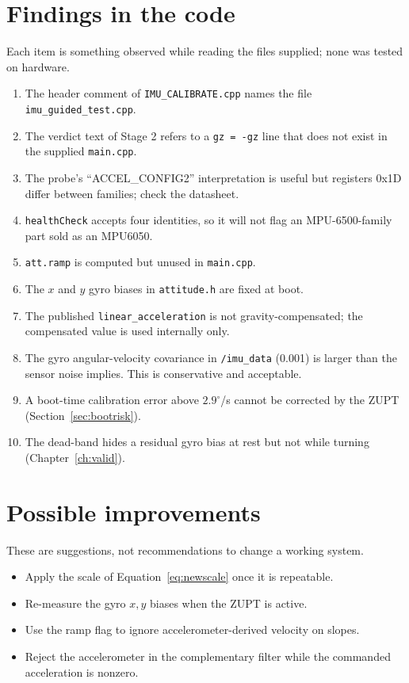 \documentclass[11pt,a4paper]{report}
\newcommand{\code}[1]{\texttt{#1}}
\begin{document}
\section{Findings in the code}
Each item is something observed while reading the files supplied; none was tested on hardware.
\begin{enumerate}[noitemsep]
  \item The header comment of \code{IMU\_CALIBRATE.cpp} names the file \code{imu\_guided\_test.cpp}.
  \item The verdict text of Stage 2 refers to a \code{gz = -gz} line that does not exist in the supplied \code{main.cpp}.
  \item The probe's ``ACCEL\_CONFIG2'' interpretation is useful but registers 0x1D differ between families; check the datasheet.
  \item \code{healthCheck} accepts four identities, so it will not flag an MPU-6500-family part sold as an MPU6050.
  \item \code{att.ramp} is computed but unused in \code{main.cpp}.
  \item The $x$ and $y$ gyro biases in \code{attitude.h} are fixed at boot.
  \item The published \code{linear\_acceleration} is not gravity-compensated; the compensated value is used internally only.
  \item The gyro angular-velocity covariance in \code{/imu\_data} (0.001) is larger than the sensor noise implies. This is conservative and acceptable.
  \item A boot-time calibration error above $2.9^\circ$/s cannot be corrected by the ZUPT (Section~\ref{sec:bootrisk}).
  \item The dead-band hides a residual gyro bias at rest but not while turning (Chapter~\ref{ch:valid}).
\end{enumerate}

\section{Possible improvements}
These are suggestions, not recommendations to change a working system.
\begin{itemize}[noitemsep]
  \item Apply the scale of Equation~\eqref{eq:newscale} once it is repeatable.
  \item Re-measure the gyro $x,y$ biases when the ZUPT is active.
  \item Use the ramp flag to ignore accelerometer-derived velocity on slopes.
  \item Reject the accelerometer in the complementary filter while the commanded acceleration is nonzero.
\end{itemize}
\end{document}
